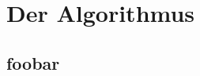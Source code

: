 \chapter{Der Algorithmus}
\label{chapter:Dokumentation-Algorithmus}

\section{foobar}
\label{section:Dokumentation-Algorithmus-foobar}

